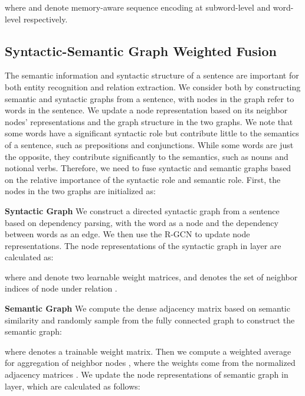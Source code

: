 \documentclass[sigconf]{acmart}
\begin{document}
\noindent where  and   denote memory-aware sequence encoding at subword-level and word-level respectively. 

\subsection{Syntactic-Semantic Graph Weighted Fusion}

The semantic information and syntactic structure of a sentence are important for both entity recognition and relation extraction. We consider both by constructing semantic and syntactic graphs from a sentence, with nodes in the graph refer to words in the sentence. We update a node representation based on its neighbor nodes' representations and the graph structure in the two graphs. We note that some words have a significant syntactic role but contribute little to the semantics of a sentence, such as prepositions and conjunctions. While some words are just the opposite, they contribute significantly to the semantics, such as nouns and notional verbs. Therefore, we need to fuse syntactic and semantic graphs based on the relative importance of the syntactic role and semantic role. First, the nodes in the two graphs are initialized as: 



\noindent\textbf{Syntactic Graph}
We construct a directed syntactic graph from a sentence based on dependency parsing, with the word as a node and the dependency between words as an edge. We then use the R-GCN \cite{schlichtkrull2018modeling} to update node representations. The node representations of the syntactic graph  in  layer are calculated as:



\noindent where  and  denote two learnable weight matrices, and  denotes the set of neighbor indices of node  under relation .

\noindent\textbf{Semantic Graph}
We compute the dense adjacency matrix based on semantic similarity and randomly sample from the fully connected graph to construct the semantic graph:



\noindent where  denotes a trainable weight matrix. Then we compute a weighted average for aggregation of neighbor nodes , where the weights come from the normalized adjacency matrices . We update the node representations of semantic graph  in  layer, which are calculated as follows:
\end{document}
